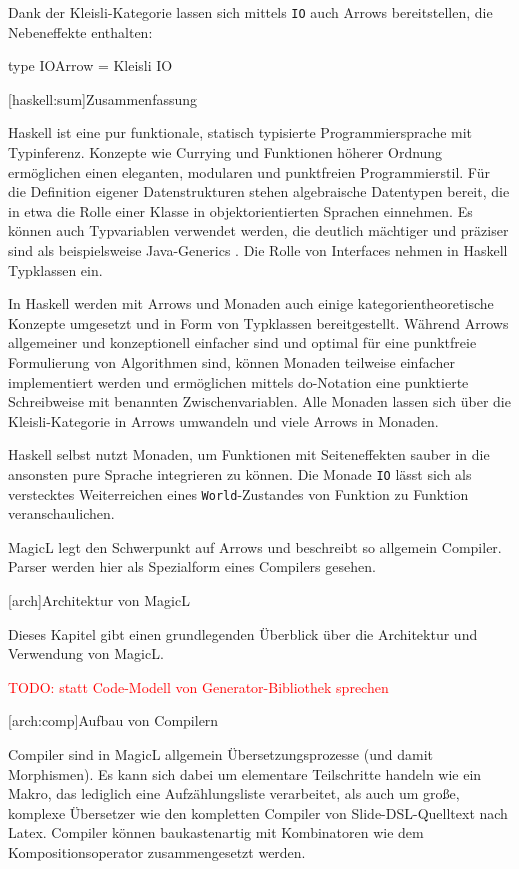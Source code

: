 \documentclass[12pt, a4paper, bibgerm]{scrbook}
\newenvironment{DIFnomarkup}{}{}
\newcommand\icode[1]{\lstinline?#1?}
\newcommand{\todo}[1]{
  \textcolor{red}{TODO: #1}
}
\newcommand\lchapter{}
\newcommand\lsection{}
\begin{document}
Dank der Kleisli-Kategorie lassen sich mittels \icode{IO} auch Arrows
bereitstellen, die Nebeneffekte enthalten:
\begin{DIFnomarkup}\begin{code}
type IOArrow = Kleisli IO
\end{code}\end{DIFnomarkup}

\lsection[haskell:sum]{Zusammenfassung}

Haskell ist eine pur funktionale, statisch typisierte Programmiersprache
mit Typinferenz. Konzepte wie Currying und Funktionen höherer Ordnung
ermöglichen einen eleganten, modularen und punktfreien
Programmierstil. Für die Definition eigener Datenstrukturen stehen
algebraische Datentypen bereit, die in etwa die Rolle einer Klasse in
objektorientierten Sprachen einnehmen. Es können auch Typvariablen
verwendet werden, die deutlich mächtiger und präziser sind als
beispielsweise Java-Generics \cite{JavaGenerics}. Die Rolle von
Interfaces nehmen in Haskell Typklassen ein.

In Haskell werden mit Arrows und Monaden auch einige
kategorientheoretische Konzepte umgesetzt und in Form von Typklassen
bereitgestellt. Während Arrows allgemeiner und konzeptionell einfacher
sind und optimal für eine punktfreie Formulierung von Algorithmen sind,
können Monaden teilweise einfacher implementiert werden und ermöglichen
mittels do-Notation eine punktierte Schreibweise mit benannten
Zwischenvariablen. Alle Monaden lassen sich über die Kleisli-Kategorie
in Arrows umwandeln und viele Arrows in Monaden.

Haskell selbst nutzt Monaden, um Funktionen mit Seiteneffekten sauber in
die ansonsten pure Sprache integrieren zu können. Die Monade \icode{IO}
lässt sich als verstecktes Weiterreichen eines \icode{World}-Zustandes von
Funktion zu Funktion veranschaulichen.

MagicL legt den Schwerpunkt auf Arrows und beschreibt so allgemein
Compiler. Parser werden hier als Spezialform eines Compilers gesehen.

\lchapter[arch]{Architektur von MagicL}

Dieses Kapitel gibt einen grundlegenden Überblick über die Architektur
und Verwendung von MagicL.

\todo{statt Code-Modell von Generator-Bibliothek sprechen}

\lsection[arch:comp]{Aufbau von Compilern}

Compiler sind in MagicL allgemein Übersetzungsprozesse (und damit
Morphismen). Es kann sich dabei um elementare Teilschritte handeln wie
ein Makro, das lediglich eine Aufzählungsliste verarbeitet, als auch um
große, komplexe Übersetzer wie den kompletten Compiler von
Slide-DSL-Quelltext nach Latex. Compiler können baukastenartig mit
Kombinatoren wie dem Kompositionsoperator zusammengesetzt werden.
\end{document}
